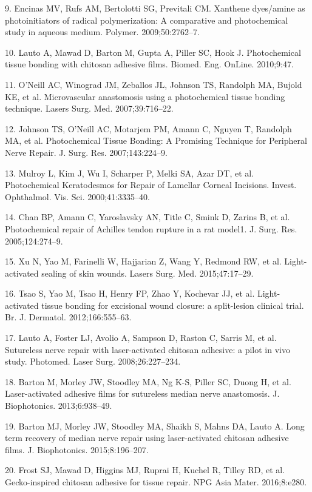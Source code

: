 9. Encinas MV, Rufs AM, Bertolotti SG, Previtali CM. Xanthene dyes/amine as photoinitiators of radical polymerization: A comparative and photochemical study in aqueous medium. Polymer. 2009;50:2762–7. 

10. Lauto A, Mawad D, Barton M, Gupta A, Piller SC, Hook J. Photochemical tissue bonding with chitosan adhesive films. Biomed. Eng. OnLine. 2010;9:47. 

11. O’Neill AC, Winograd JM, Zeballos JL, Johnson TS, Randolph MA, Bujold KE, et al. Microvascular anastomosis using a photochemical tissue bonding 
technique. Lasers Surg. Med. 2007;39:716–22. 

12. Johnson TS, O’Neill AC, Motarjem PM, Amann C, Nguyen T, Randolph MA, et al. Photochemical Tissue Bonding: A Promising Technique for Peripheral Nerve Repair. J. Surg. Res. 2007;143:224–9. 

13. Mulroy L, Kim J, Wu I, Scharper P, Melki SA, Azar DT, et al. Photochemical Keratodesmos for Repair of Lamellar Corneal Incisions. Invest. Ophthalmol. Vis. Sci. 2000;41:3335–40. 

14. Chan BP, Amann C, Yaroslavsky AN, Title C, Smink D, Zarins B, et al. Photochemical repair of Achilles tendon rupture in a rat model1. J. Surg. Res. 2005;124:274–9. 

15. Xu N, Yao M, Farinelli W, Hajjarian Z, Wang Y, Redmond RW, et al. Light-activated sealing of skin wounds. Lasers Surg. Med. 2015;47:17–29. 

16. Tsao S, Yao M, Tsao H, Henry FP, Zhao Y, Kochevar JJ, et al. Light-activated tissue bonding for excisional wound closure: a split-lesion clinical trial. Br. J. Dermatol. 2012;166:555–63. 

17. Lauto A, Foster LJ, Avolio A, Sampson D, Raston C, Sarris M, et al. Sutureless nerve repair with laser-activated chitosan adhesive: a pilot in vivo study. Photomed. Laser Surg. 2008;26:227–234. 

18. Barton M, Morley JW, Stoodley MA, Ng K-S, Piller SC, Duong H, et al. Laser-activated adhesive films for sutureless median nerve anastomosis. J. Biophotonics. 2013;6:938–49. 

19. Barton MJ, Morley JW, Stoodley MA, Shaikh S, Mahns DA, Lauto A. Long term recovery of median nerve repair using laser-activated chitosan adhesive films. J. Biophotonics. 2015;8:196–207. 

20. Frost SJ, Mawad D, Higgins MJ, Ruprai H, Kuchel R, Tilley RD, et al. Gecko-inspired chitosan adhesive for tissue repair. NPG Asia Mater. 2016;8:e280. 

